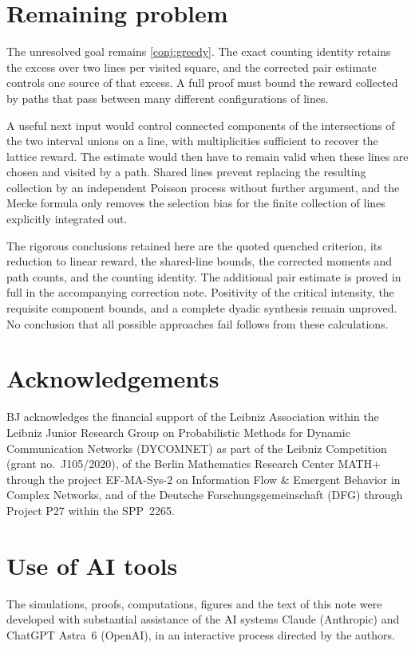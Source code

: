 \documentclass[11pt,letterpaper]{article}
\begin{document}
\section{Remaining problem}
\label{sec:outlook}

The unresolved goal remains \cref{conj:greedy}. The exact counting identity retains the excess over two lines per visited square, and the corrected pair estimate controls one source of that excess. A full proof must bound the reward collected by paths that pass between many different configurations of lines.

A useful next input would control connected components of the intersections of the two interval unions on a line, with multiplicities sufficient to recover the lattice reward. The estimate would then have to remain valid when these lines are chosen and visited by a path. Shared lines prevent replacing the resulting collection by an independent Poisson process without further argument, and the Mecke formula only removes the selection bias for the finite collection of lines explicitly integrated out.

The rigorous conclusions retained here are the quoted quenched criterion, its reduction to linear reward, the shared-line bounds, the corrected moments and path counts, and the counting identity. The additional pair estimate is proved in full in the accompanying correction note. Positivity of the critical intensity, the requisite component bounds, and a complete dyadic synthesis remain unproved. No conclusion that all possible approaches fail follows from these calculations.

\section*{Acknowledgements}

BJ acknowledges the financial support of the Leibniz Association within the Leibniz Junior Research Group on Probabilistic Methods for Dynamic Communication Networks (DYCOMNET) as part of the Leibniz Competition (grant no.~J105/2020), of the Berlin Mathematics Research Center MATH+ through the project EF-MA-Sys-2 on Information Flow \& Emergent Behavior in Complex Networks, and of the Deutsche Forschungsgemeinschaft (DFG) through Project P27 within the SPP~2265.

\section*{Use of AI tools}

The simulations, proofs, computations, figures and the text of this note were developed with substantial assistance of the AI systems Claude (Anthropic) and ChatGPT Astra~6 (OpenAI), in an interactive process directed by the authors.



\end{document}
